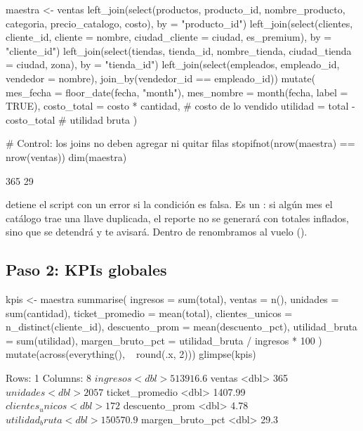 \begin{rcode}[title=Reporte mensual: tabla maestra]
maestra <- ventas %
  left_join(select(productos, producto_id, nombre_producto, categoria,
                   precio_catalogo, costo),
            by = "producto_id") %
  left_join(select(clientes, cliente_id, cliente = nombre,
                   ciudad_cliente = ciudad, es_premium),
            by = "cliente_id") %
  left_join(select(tiendas, tienda_id, nombre_tienda,
                   ciudad_tienda = ciudad, zona),
            by = "tienda_id") %
  left_join(select(empleados, empleado_id, vendedor = nombre),
            join_by(vendedor_id == empleado_id)) %
  mutate(
    mes_fecha   = floor_date(fecha, "month"),
    mes_nombre  = month(fecha, label = TRUE),
    costo_total = costo * cantidad,          # costo de lo vendido
    utilidad    = total - costo_total        # utilidad bruta
  )

# Control: los joins no deben agregar ni quitar filas
stopifnot(nrow(maestra) == nrow(ventas))
dim(maestra)
\end{rcode}
\begin{rsalida}
[1] 365  29
\end{rsalida}

 detiene el script con un error si la condición es
falsa. Es un : si algún mes el catálogo trae una
llave duplicada, el reporte no se generará con totales inflados, sino que
se detendrá y te avisará. Dentro de  renombramos al vuelo
().

\subsection{Paso 2: KPIs globales}

\begin{rcode}[title=Reporte mensual: KPIs]
kpis <- maestra %
  summarise(
    ingresos          = sum(total),
    ventas            = n(),
    unidades          = sum(cantidad),
    ticket_promedio   = mean(total),
    clientes_unicos   = n_distinct(cliente_id),
    descuento_prom    = mean(descuento_pct),
    utilidad_bruta    = sum(utilidad),
    margen_bruto_pct  = utilidad_bruta / ingresos * 100
  ) %
  mutate(across(everything(), ~ round(.x, 2)))
glimpse(kpis)
\end{rcode}
\begin{rsalida}
Rows: 1
Columns: 8
$ ingresos         <dbl> 513916.6
$ ventas           <dbl> 365
$ unidades         <dbl> 2057
$ ticket_promedio  <dbl> 1407.99
$ clientes_unicos  <dbl> 172
$ descuento_prom   <dbl> 4.78
$ utilidad_bruta   <dbl> 150570.9
$ margen_bruto_pct <dbl> 29.3
\end{rsalida}

